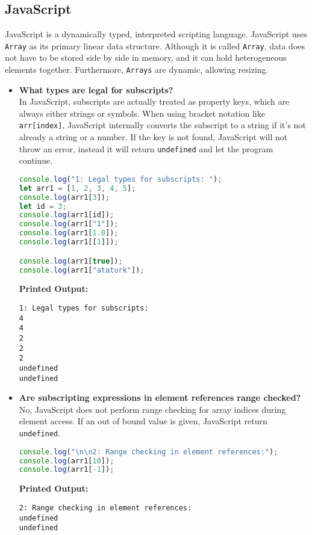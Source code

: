 \documentclass{article}
\begin{document}
\subsection{JavaScript}
JavaScript is a dynamically typed, interpreted scripting language. JavaScript uses \texttt{Array} as its primary linear data structure. Although it is called \texttt{Array}, data does not have to be stored side by side in memory, and it can hold heterogeneous elements together. Furthermore, \texttt{Arrays} are dynamic, allowing resizing.

\begin{itemize}
\item \textbf{What types are legal for subscripts?} \\
In JavaScript, subscripts are actually treated as property keys, which are always either strings or symbols. When using bracket notation like \texttt{arr[index]}, JavaScript internally converts the subscript to a string if it's not already a string or a number. If the key is not found, JavaScript will not throw an error, instead it will return \texttt{undefined} and let the program continue.
\begin{lstlisting}[language=JavaScript]
console.log("1: Legal types for subscripts: ");
let arr1 = [1, 2, 3, 4, 5];
console.log(arr1[3]);
let id = 3;
console.log(arr1[id]);
console.log(arr1["1"]);
console.log(arr1[1.0]);
console.log(arr1[[1]]);

console.log(arr1[true]); 
console.log(arr1["ataturk"]);
\end{lstlisting}
\textbf{Printed Output:}
\begin{verbatim}
1: Legal types for subscripts: 
4
4
2
2
2
undefined
undefined
\end{verbatim}


\item \textbf{Are subscripting expressions in element references range checked?} \\
No, JavaScript does not perform range checking for array indices during element access. If an out of bound value is given, JavaScript return \texttt{undefined}.
\begin{lstlisting}[language=JavaScript]
console.log("\n\n2: Range checking in element references:");
console.log(arr1[10]);
console.log(arr1[-1]);
\end{lstlisting}
\textbf{Printed Output:}
\begin{verbatim}
2: Range checking in element references:
undefined
undefined
\end{verbatim}



\end{itemize}
\end{document}
